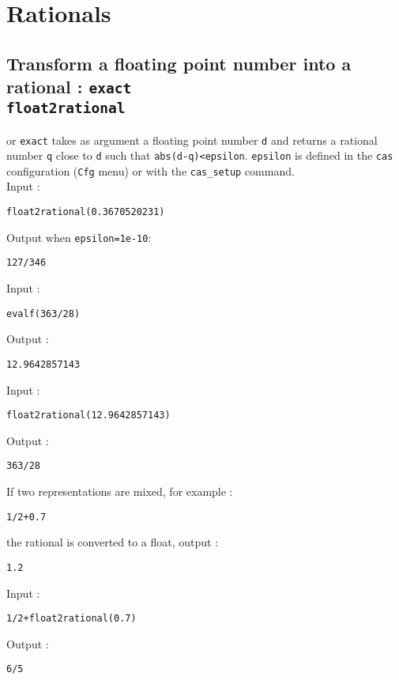 \documentclass[a4paper,11pt]{book}
\begin{document}
\section{Rationals}
\subsection{Transform a floating point number into a rational : {\tt exact \\
float2rational}}
  or {\tt exact} takes as argument a  
floating point number {\tt d} and returns 
a rational number {\tt q} close to 
{\tt d} such that {\tt abs(d-q)<epsilon}. 
{\tt epsilon} is defined in the {\tt cas} configuration
({\tt Cfg} menu) or with the {\tt cas\_setup} command.\\
Input :
\begin{center}{\tt float2rational(0.3670520231)}\end{center}
Output when {\tt epsilon=1e-10}:
\begin{center}{\tt 127/346}\end{center}
Input :
\begin{center}{\tt evalf(363/28)}\end{center}
Output :
\begin{center}{\tt 12.9642857143}\end{center}
Input :
\begin{center}{\tt float2rational(12.9642857143)}\end{center}
Output :
\begin{center}{\tt 363/28}\end{center}
If two representations are mixed, for example :
\begin{center}{\tt 1/2+0.7}\end{center}
the rational is converted to a float, output :
\begin{center}{\tt 1.2}\end{center} 
Input :
\begin{center}{\tt 1/2+float2rational(0.7)}\end{center}
Output :
\begin{center}{\tt 6/5}\end{center}
\end{document}
